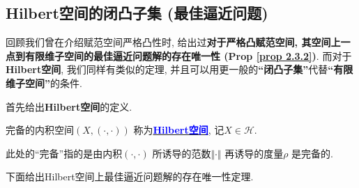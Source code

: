 \newpage

\subsection{Hilbert空间的闭凸子集 (最佳逼近问题)}
	回顾我们曾在介绍赋范空间严格凸性时, 给出过\textbf{对于严格凸赋范空间, 其空间上一点到有限维子空间的最佳逼近问题解的存在唯一性 (Prop \ref{prop 2.3.2})}. 而对于\textbf{Hilbert空间}, 我们同样有类似的定理, 并且可以用更一般的\textbf{“闭凸子集”}代替\textbf{“有限维子空间”}的条件. 
	
	\vspace{1em}
	
	首先给出\textbf{Hilbert空间}的定义. 
	
	\vspace{1em}
	
	\begin{defn}\label{def 3.3.2}
		完备的内积空间$(X , (\cdot , \cdot))$ 称为\underline{\textcolor{blue}{\textbf{Hilbert空间}}}, 记$X \in \mathcal{H}$. 
		
		\begin{rmk}
			此处的“完备”指的是由内积$(\cdot , \cdot)$ 所诱导的范数$\Vert \cdot \Vert$ 再诱导的度量$\rho$ 是完备的. 
		\end{rmk}
	\end{defn}
	
	\vspace{4em}
	
	下面给出Hilbert空间上最佳逼近问题解的存在唯一性定理. 
	
	\vspace{1em}
	
